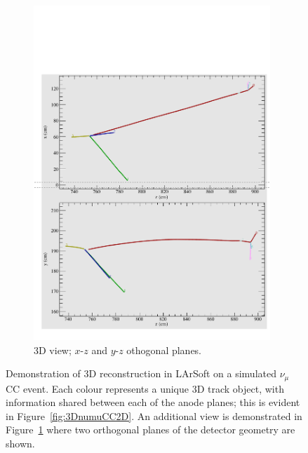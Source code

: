 \begin{figure}
  \hfill
  \begin{subfigure}[t]{0.48\linewidth}
    \centering
    \includegraphics[width=0.98\textwidth]{3DnumuCC3D.pdf}
    \caption{3D view; $x$-$z$ and $y$-$z$ othogonal planes.}
    \label{fig:3DnumuCC3D}
  \end{subfigure}
  \caption[Demonstration of 3D reconstruction in LArSoft on a simulated $\nu_{\mu}$CC event.]{Demonstration of 3D reconstruction in LArSoft on a simulated $\nu_{\mu}$CC event.  Each colour represents a unique 3D track object, with information shared between each of the anode planes; this is evident in Figure~\ref{fig:3DnumuCC2D}.  An additional view is demonstrated in Figure~\ref{fig:3DnumuCC3D} where two orthogonal planes of the detector geometry are shown.}
  \label{fig:3DnumuCC}
\end{figure}

